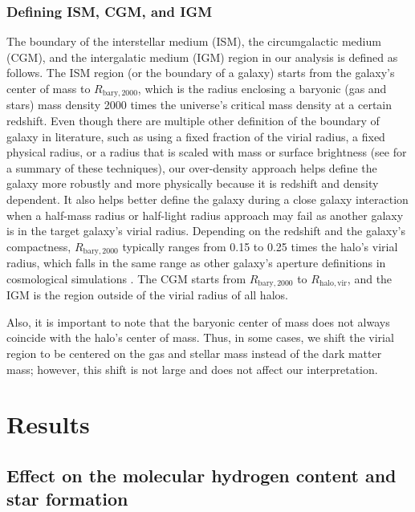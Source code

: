 \documentclass[linenumbers, twocolumn]{aastex631}
\begin{document}
\subsubsection{Defining ISM, CGM, and IGM}

The boundary of the interstellar medium (ISM), the circumgalactic medium (CGM), and the intergalatic medium (IGM) region in our analysis is defined as follows. The ISM region (or the boundary of a galaxy) starts from the galaxy's center of mass to $R_{\mathrm{bary}, 2000}$, which is the radius enclosing a baryonic (gas and stars) mass density 2000 times the universe's critical mass density at a certain redshift. Even though there are multiple other definition of the boundary of galaxy in literature, such as using a fixed fraction of the virial radius, a fixed physical radius, or a radius that is scaled with mass or surface brightness (see \citealp{Stevens+2014} for a summary of these techniques), our over-density approach helps define the galaxy more robustly and more physically because it is redshift and density dependent. It also helps better define the galaxy during a close galaxy interaction when a half-mass radius or half-light radius approach may fail as another galaxy is in the target galaxy's virial radius. Depending on the redshift and the galaxy's compactness, $R_{\mathrm{bary}, 2000}$ typically ranges from 0.15 to 0.25 times the halo's virial radius, which falls in the same range as other galaxy's aperture definitions in cosmological simulations \citep{Stevens+2014}. The CGM starts from $R_{\mathrm{bary}, 2000}$ to $R_{\mathrm{halo,vir}}$, and the IGM is the region outside of the virial radius of all halos.

Also, it is important to note that the baryonic center of mass does not always coincide with the halo's center of mass. Thus, in some cases, we shift the virial region to be centered on the gas and stellar mass instead of the dark matter mass; however, this shift is not large and does not affect our interpretation.    
 
\section{Results}

\subsection{Effect on the molecular hydrogen content and star formation}
\label{subsect:effect_on_sf}
\end{document}
